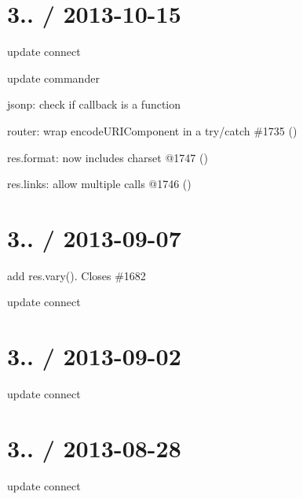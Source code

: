 {\ttfamily \section*{3.. / 2013-\/10-\/15 }}

{\ttfamily }

{\ttfamily 
\begin{DoxyItemize}
\item update connect
\item update commander
\item jsonp\+: check if callback is a function
\item router\+: wrap encode\+U\+R\+I\+Component in a try/catch \#1735 ()
\item res.\+format\+: now includes charset @1747 ()
\item res.\+links\+: allow multiple calls @1746 ()
\end{DoxyItemize}}

{\ttfamily \section*{3.. / 2013-\/09-\/07 }}

{\ttfamily }

{\ttfamily 
\begin{DoxyItemize}
\item add res.\+vary(). Closes \#1682
\item update connect
\end{DoxyItemize}}

{\ttfamily \section*{3.. / 2013-\/09-\/02 }}

{\ttfamily }

{\ttfamily 
\begin{DoxyItemize}
\item update connect
\end{DoxyItemize}}

{\ttfamily \section*{3.. / 2013-\/08-\/28 }}

{\ttfamily }

{\ttfamily 
\begin{DoxyItemize}
\item update connect
\end{DoxyItemize}}

